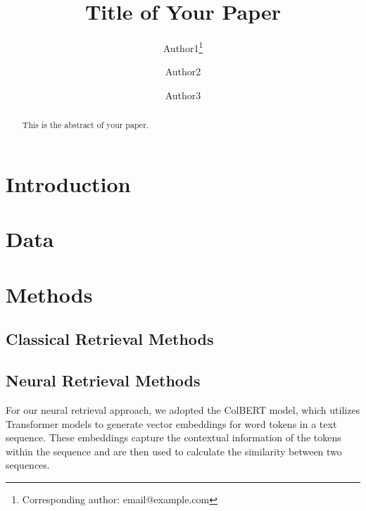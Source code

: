 \documentclass{article}
\title{Title of Your Paper}
\author{Author1\thanks{Corresponding author: email@example.com} \and Author2 \and Author3}
\date{} %
\begin{document}
\maketitle

\begin{abstract}
This is the abstract of your paper.
\end{abstract}


\section{Introduction}

\section{Data}

\section{Methods}
\subsection{Classical Retrieval Methods}

\subsection{Neural Retrieval Methods}
For our neural retrieval approach, we adopted the ColBERT model, which utilizes Transformer models to generate vector embeddings for word tokens in a text sequence. These embeddings capture the contextual information of the tokens within the sequence and are then used to calculate the similarity between two sequences.
\end{document}
